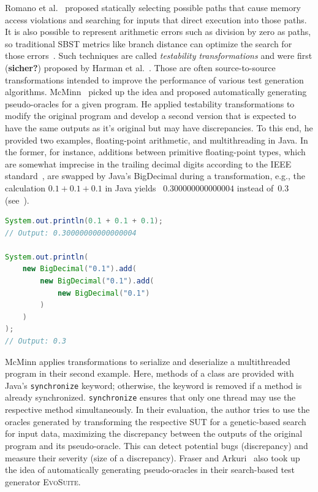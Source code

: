 \documentclass[paper=a4,%
  twoside,%
  BCOR4mm,%
  abstract=true,%
  toc=bibliography,%
  chapterprefix=true,%
  toc=bibliographynumbered,%
  open=right,%
  english,%
  pagesize=pdftex]{scrreprt}
\begin{document}
Romano et al.~\cite{Romano2011} proposed statically selecting possible paths that cause memory access violations and searching for inputs that direct execution into those paths. It is also possible to represent arithmetic errors such as division by zero as paths, so traditional \ac{SBST} metrics like branch distance can optimize the search for those errors~\cite{Bhattacharya2011}. Such techniques are called \emph{testability transformations} and were first (\textbf{sicher?}) proposed by Harman et al.~\cite{Harman2004}. Those are often source-to-source transformations intended to improve the performance of various test generation algorithms. McMinn~\cite{McMinn2009} picked up the idea and proposed automatically generating pseudo-oracles for a given program. He applied testability transformations to modify the original program and develop a second version that is expected to have the same outputs as it's original but may have discrepancies. To this end, he provided two examples, floating-point arithmetic, and multithreading in Java. In the former, for instance, additions between primitive floating-point types, which are somewhat imprecise in the trailing decimal digits according to the IEEE standard~\cite{10.1145/103162.103163}, are swapped by Java's BigDecimal during a transformation, e.g., the calculation $0.1 + 0.1 + 0.1$ in Java yields ~$0.300000000000004$ instead of~$0.3$ (see~).

\begin{lstlisting}[language=Java, style=boxed, caption={Comparing floating-point arithmetic in Java using double compared to \code{BigDecimal}~\cite{McMinn2009}}, label=lst:java-transformations]
System.out.println(0.1 + 0.1 + 0.1);
// Output: 0.30000000000000004

System.out.println(
    new BigDecimal("0.1").add(
        new BigDecimal("0.1").add(
            new BigDecimal("0.1")
        )
    )
);
// Output: 0.3
\end{lstlisting}

McMinn applies transformations to serialize and deserialize a multithreaded program in their second example. Here, methods of a class are provided with Java's \texttt{synchronize} keyword; otherwise, the keyword is removed if a method is already synchronized. \texttt{synchronize} ensures that only one thread may use the respective method simultaneously. In their evaluation, the author tries to use the oracles generated by transforming the respective \ac{SUT} for a genetic-based search for input data, maximizing the discrepancy between the outputs of the original program and its pseudo-oracle. This can detect potential bugs (discrepancy) and measure their severity (size of a discrepancy). Fraser and Arkuri~\cite{Fraser_2013} also took up the idea of automatically generating pseudo-oracles in their search-based test generator \textsc{EvoSuite}.
\end{document}
